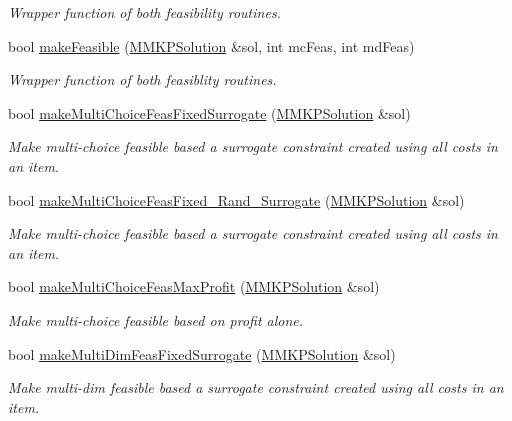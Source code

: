 \begin{DoxyCompactItemize}
\begin{DoxyCompactList}\small\item\em Wrapper function of both feasibility routines. \end{DoxyCompactList}\item 
bool \hyperlink{class_m_m_k_p___meta_heuristic_a1e212fa49412eea9d7c92a060c507f1e}{make\+Feasible} (\hyperlink{class_m_m_k_p_solution}{M\+M\+K\+P\+Solution} \&sol, int mc\+Feas, int md\+Feas)
\begin{DoxyCompactList}\small\item\em Wrapper function of both feasiblity routines. \end{DoxyCompactList}\item 
bool \hyperlink{class_m_m_k_p___meta_heuristic_aecab1f3c3f99ec38b8a7d17eddc3a2fa}{make\+Multi\+Choice\+Feas\+Fixed\+Surrogate} (\hyperlink{class_m_m_k_p_solution}{M\+M\+K\+P\+Solution} \&sol)
\begin{DoxyCompactList}\small\item\em Make multi-\/choice feasible based a surrogate constraint created using all costs in an item. \end{DoxyCompactList}\item 
bool \hyperlink{class_m_m_k_p___meta_heuristic_ac6f2cfca54b049ca235e236df4c13000}{make\+Multi\+Choice\+Feas\+Fixed\+\_\+\+Rand\+\_\+\+Surrogate} (\hyperlink{class_m_m_k_p_solution}{M\+M\+K\+P\+Solution} \&sol)
\begin{DoxyCompactList}\small\item\em Make multi-\/choice feasible based a surrogate constraint created using all costs in an item. \end{DoxyCompactList}\item 
bool \hyperlink{class_m_m_k_p___meta_heuristic_a420fe35418f1556624cf7fde56268cd5}{make\+Multi\+Choice\+Feas\+Max\+Profit} (\hyperlink{class_m_m_k_p_solution}{M\+M\+K\+P\+Solution} \&sol)
\begin{DoxyCompactList}\small\item\em Make multi-\/choice feasible based on profit alone. \end{DoxyCompactList}\item 
bool \hyperlink{class_m_m_k_p___meta_heuristic_aa98a53046010f99385c3592181398668}{make\+Multi\+Dim\+Feas\+Fixed\+Surrogate} (\hyperlink{class_m_m_k_p_solution}{M\+M\+K\+P\+Solution} \&sol)
\begin{DoxyCompactList}\small\item\em Make multi-\/dim feasible based a surrogate constraint created using all costs in an item. \end{DoxyCompactList}\item 

\end{DoxyCompactItemize}
